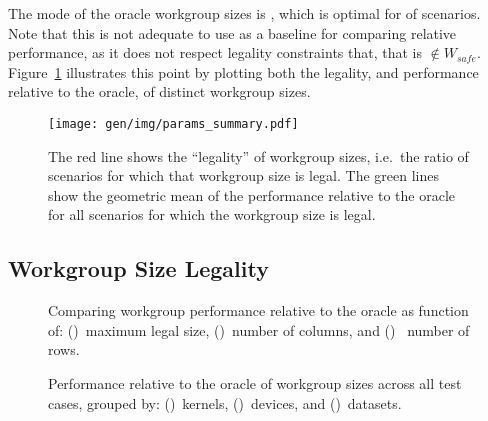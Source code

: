 The mode of the oracle workgroup sizes is
, which is optimal for
 of scenarios. Note that this is
not adequate to use as a baseline for comparing relative performance,
as it does not respect legality constraints that, that is
$ \not\in W_{safe}$.
Figure~\ref{fig:performance-legality} illustrates this point by
plotting both the legality, and performance relative to the oracle, of
distinct workgroup sizes.


\begin{figure}
\centering
\texttt{[image: gen/img/params\_summary.pdf]}
\caption{%
  The red line shows the ``legality'' of workgroup sizes, i.e.\ the
  ratio of scenarios for which that workgroup size is legal.  The
  green lines show the geometric mean of the performance relative to
  the oracle for all scenarios for which the workgroup size is legal.%
}
\label{fig:performance-legality}
\end{figure}


\subsection{Workgroup Size Legality}


\cleardoublepage
\begin{figure}

\caption{%
  Comparing workgroup performance relative to the oracle as function
  of: ()~maximum legal size,
  ()~number of columns, and
  ()~ number of rows.%
}
\label{fig:performance-wgsizes}
\end{figure}
\newpage
\begin{figure}

\caption{%
  Performance relative to the oracle of workgroup sizes across all
  test cases, grouped by: ()~kernels,
  ()~devices, and
  ()~datasets.%
}
\label{fig:performances}
\end{figure}

%


